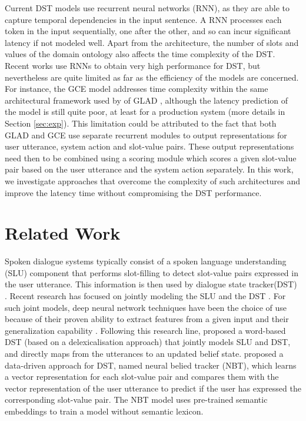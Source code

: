 \documentclass{article}
\begin{document}
Current DST models use recurrent neural networks (RNN), as they are able to capture temporal dependencies in the input sentence.
A RNN processes each token in the input sequentially, one after the other, and so can incur significant latency if not modeled well.
Apart from the architecture, the number of slots and values of the domain ontology also affects the time complexity of the DST.
Recent works \cite{NBT, GLAD, Ren2018} use RNNs to obtain very high performance for DST, but nevertheless are quite limited as far as the efficiency of the models are concerned.
For instance, the GCE model \cite{GCE} addresses time complexity within the same architectural framework used by of GLAD \cite{GLAD}, although the latency prediction of the model is still quite poor, at least for a production system (more details in Section \ref{sec:exp}).
This limitation could be attributed to the fact that both GLAD and GCE use separate recurrent modules to output representations for user utterance, system action and slot-value pairs.
These output representations need then to be combined using a scoring module which scores a given slot-value pair based on the user utterance and the system action separately.
In this work, we investigate approaches that overcome the complexity of such architectures and improve the latency time without compromising the DST performance.


\section{Related Work}
\label{sec:rel_work}
Spoken dialogue systems typically consist of a spoken language understanding (SLU) component that performs slot-filling to detect slot-value pairs expressed in the user utterance.
This information is then used by dialogue state tracker(DST) \cite{Wang2013, Sun2015a}.
Recent research has focused on jointly modeling the SLU and the DST \cite{Henderson2014, Wen2017}.
For such joint models, deep neural network techniques have been the choice of use because of their proven ability to extract features from a given input and their generalization capability \cite{Henderson2014, Wen2017, NBT, Ren2018}.
Following this research line, \cite{Henderson2014} proposed a word-based DST (based on a delexicalisation approach) that jointly models SLU and DST, and directly maps from the utterances to an updated belief state.
\cite{NBT} proposed a data-driven approach for DST, named neural belied tracker (NBT), which learns a vector representation for each slot-value pair and compares them with the vector representation of the user utterance to predict if the user has expressed the corresponding slot-value pair.
The NBT model uses pre-trained semantic embeddings to train a model without semantic lexicon.
\end{document}
